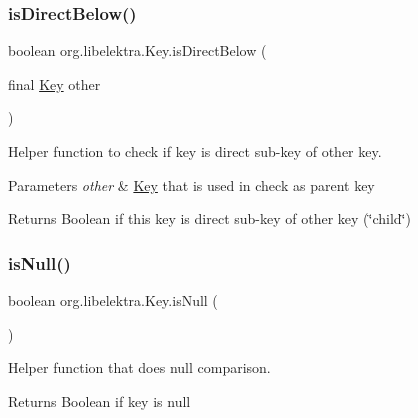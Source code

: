 \subsubsection{\texorpdfstring{is\+Direct\+Below()}{isDirectBelow()}}
{\footnotesize\ttfamily boolean org.\+libelektra.\+Key.\+is\+Direct\+Below (\begin{DoxyParamCaption}\item[{final \hyperlink{classorg_1_1libelektra_1_1Key}{Key}}]{other }\end{DoxyParamCaption})\hspace{0.3cm}{\ttfamily [inline]}}



Helper function to check if key is direct sub-\/key of other key. 


\begin{DoxyParams}{Parameters}
{\em other} & \hyperlink{classorg_1_1libelektra_1_1Key}{Key} that is used in check as parent key \\
\hline
\end{DoxyParams}
\begin{DoxyReturn}{Returns}
Boolean if this key is direct sub-\/key of other key (\char`\"{}child\char`\"{}) 
\end{DoxyReturn}
\mbox{\label{classorg_1_1libelektra_1_1Key_adfcebdd407d050b0626a8f2cfec00e8b}} 
\subsubsection{\texorpdfstring{is\+Null()}{isNull()}}
{\footnotesize\ttfamily boolean org.\+libelektra.\+Key.\+is\+Null (\begin{DoxyParamCaption}{ }\end{DoxyParamCaption})\hspace{0.3cm}{\ttfamily [inline]}}



Helper function that does null comparison. 

\begin{DoxyReturn}{Returns}
Boolean if key is null 
\end{DoxyReturn}
\mbox{\label{classorg_1_1libelektra_1_1Key_acb0e1141fa920b798a66a2076cd61562}} 
